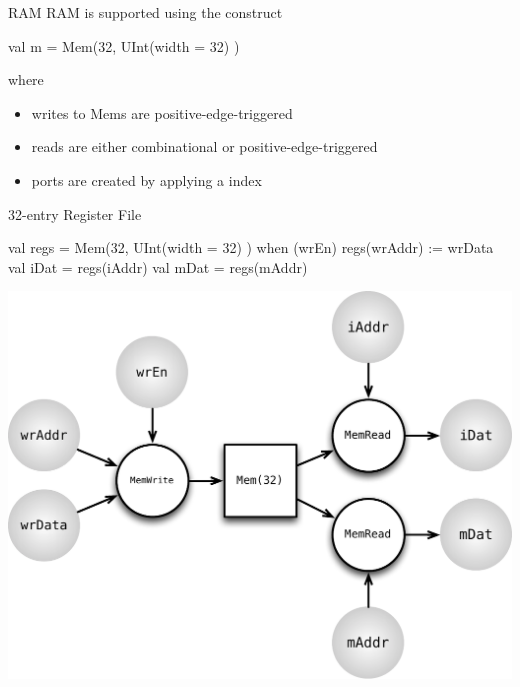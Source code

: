 \documentclass[xcolor=pdflatex,dvipsnames,table]{beamer}
\begin{document}
\begin{frame}[fragile]{RAM}
RAM is supported using the  construct

\begin{scala}
val m = Mem(32, UInt(width = 32) )
\end{scala}

\noindent
where
\begin{itemize}
\item writes to Mems are positive-edge-triggered
\item reads are either combinational or positive-edge-triggered
\item ports are created by applying a  index
\end{itemize}
\end{frame}

\begin{frame}[fragile]{32-entry Register File}

\begin{scala}
val regs = Mem(32, UInt(width = 32) )
when (wrEn) {
  regs(wrAddr) := wrData
}
val iDat = regs(iAddr)
val mDat = regs(mAddr)
\end{scala}

\begin{center}
\includegraphics[height=0.55\textheight]{figs/mem.pdf} 
\end{center}

\end{frame}
\end{document}
